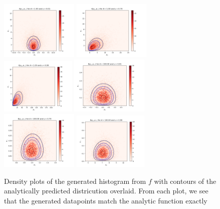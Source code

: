 \documentclass[english]{article}
\begin{document}
\begin{figure}[h]
	\includegraphics[width=0.33\textwidth]{plot_distribution_2D_u_0p01_A_1.png}
	\includegraphics[width=0.33\textwidth]{plot_distribution_2D_u_0p7_A_1.png}
	\includegraphics[width=0.32\textwidth]{plot_distribution_2D_u_0p99_A_1.png}
	\includegraphics[width=0.33\textwidth]{plot_distribution_2D_u_0p01_A_100.png}
	\includegraphics[width=0.33\textwidth]{plot_distribution_2D_u_0p7_A_100.png}
	\includegraphics[width=0.32\textwidth]{plot_distribution_2D_u_0p99_A_100.png}
	\label{fig:high_A}
	\caption{Density plots of the generated histogram from $f$ with contours of the 
	analytically predicted districution overlaid. From each plot, we see that the 
	generated datapoints match the analytic function exactly}
\end{figure}
\end{document}
